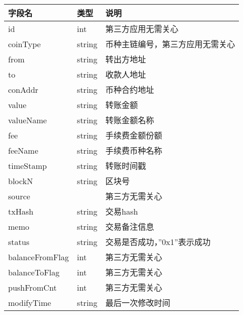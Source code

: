 \documentclass[letterpaper,10pt,english]{sphinxmanual}
\begin{document}


\begin{savenotes}\sphinxattablestart
\centering
\begin{tabulary}{\linewidth}[t]{|T|T|T|}
\hline
\sphinxstyletheadfamily 
字段名
&\sphinxstyletheadfamily 
类型
&\sphinxstyletheadfamily 
说明
\\
\hline
id
&
int
&
第三方应用无需关心
\\
\hline
coinType
&
string
&
币种主链编号，第三方应用无需关心
\\
\hline
from
&
string
&
转出方地址
\\
\hline
to
&
string
&
收款人地址
\\
\hline
conAddr
&
string
&
币种合约地址
\\
\hline
value
&
string
&
转账金额
\\
\hline
valueName
&
string
&
转账金额名称
\\
\hline
fee
&
string
&
手续费金额份额
\\
\hline
feeName
&
string
&
手续费币种名称
\\
\hline
timeStamp
&
string
&
转账时间戳
\\
\hline
blockN
&
string
&
区块号
\\
\hline
source
&&
第三方无需关心
\\
\hline
txHash
&
string
&
交易hash
\\
\hline
memo
&
string
&
交易备注信息
\\
\hline
status
&
string
&
交易是否成功，”0x1”表示成功
\\
\hline
balanceFromFlag
&
int
&
第三方无需关心
\\
\hline
balanceToFlag
&
int
&
第三方无需关心
\\
\hline
pushFromCnt
&
int
&
第三方无需关心
\\
\hline
modifyTime
&
string
&
最后一次修改时间
\\
\hline
\end{tabulary}
\par
\sphinxattableend\end{savenotes}


\begin{sphinxVerbatim}[commandchars=\\\{\}]
     
\end{sphinxVerbatim}
\end{document}
